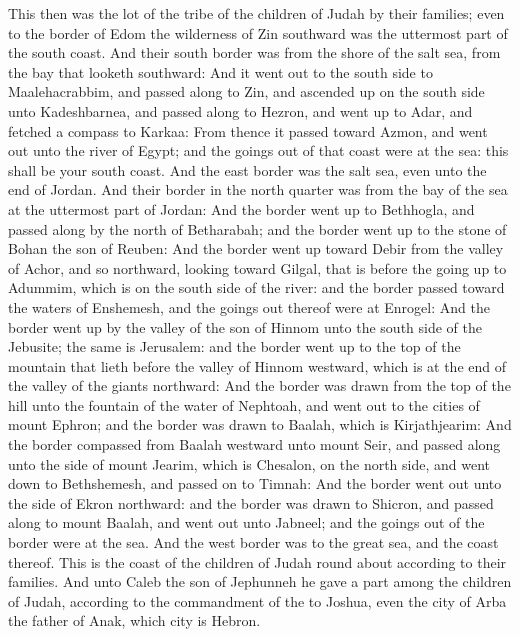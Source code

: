 \begin{biblechapter} %
 This then was the lot of the tribe of the children of Judah by their families; even to the border of Edom the wilderness of Zin southward was the uttermost part of the south coast.
\verse And their south border was from the shore of the salt sea, from the bay that looketh southward:
\verse And it went out to the south side to Maalehacrabbim, and passed along to Zin, and ascended up on the south side unto Kadeshbarnea, and passed along to Hezron, and went up to Adar, and fetched a compass to Karkaa:
\verse From thence it passed toward Azmon, and went out unto the river of Egypt; and the goings out of that coast were at the sea: this shall be your south coast.
\verse And the east border was the salt sea, even unto the end of Jordan. And their border in the north quarter was from the bay of the sea at the uttermost part of Jordan:
\verse And the border went up to Bethhogla, and passed along by the north of Betharabah; and the border went up to the stone of Bohan the son of Reuben:
\verse And the border went up toward Debir from the valley of Achor, and so northward, looking toward Gilgal, that is before the going up to Adummim, which is on the south side of the river: and the border passed toward the waters of Enshemesh, and the goings out thereof were at Enrogel:
\verse And the border went up by the valley of the son of Hinnom unto the south side of the Jebusite; the same is Jerusalem: and the border went up to the top of the mountain that lieth before the valley of Hinnom westward, which is at the end of the valley of the giants northward:
\verse And the border was drawn from the top of the hill unto the fountain of the water of Nephtoah, and went out to the cities of mount Ephron; and the border was drawn to Baalah, which is Kirjathjearim:
\verse And the border compassed from Baalah westward unto mount Seir, and passed along unto the side of mount Jearim, which is Chesalon, on the north side, and went down to Bethshemesh, and passed on to Timnah:
\verse And the border went out unto the side of Ekron northward: and the border was drawn to Shicron, and passed along to mount Baalah, and went out unto Jabneel; and the goings out of the border were at the sea.
\verse And the west border was to the great sea, and the coast thereof. This is the coast of the children of Judah round about according to their families.
\verse And unto Caleb the son of Jephunneh he gave a part among the children of Judah, according to the commandment of the \LORD to Joshua, even the city of Arba the father of Anak, which city is Hebron.

\end{biblechapter}

